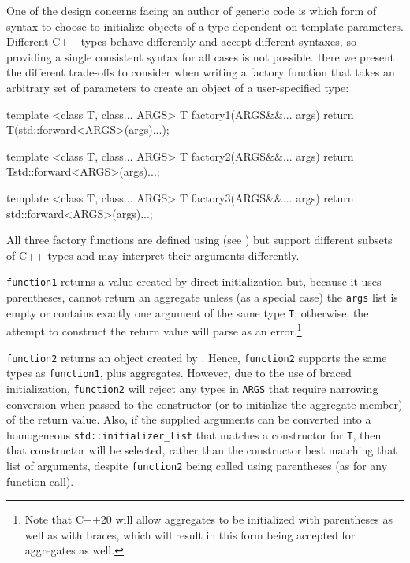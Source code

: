 One of the design concerns facing an author of generic code is which
form of syntax to choose to initialize objects of a type dependent on
template parameters. Different C++ types behave differently and accept
different syntaxes, so providing a single consistent syntax for all
cases is not possible. Here we present the different trade-offs to
consider when writing a factory function that takes an arbitrary set of
parameters to create an object of a user-specified type:

\begin{emcppslisting}
template <class T, class... ARGS>
T factory1(ARGS&&... args)
{
    return T(std::forward<ARGS>(args)...);
}

template <class T, class... ARGS>
T factory2(ARGS&&... args)
{
    return T{std::forward<ARGS>(args)...};
}

template <class T, class... ARGS>
T factory3(ARGS&&... args)
{
    return {std::forward<ARGS>(args)...};
}
\end{emcppslisting}


\noindent All three factory functions are defined using  (see ) but support
different subsets of C++ types and may interpret their arguments
differently.

\lstinline!function1! returns a value created by direct initialization but,
because it uses parentheses, cannot return an aggregate unless (as a
special case) the \lstinline!args! list is empty or contains exactly one
argument of the same type \lstinline!T!; otherwise, the attempt to
construct the return value will parse as an error.{\cprotect\footnote{Note
that C++20 will allow aggregates to be initialized with parentheses as
well as with braces, which will result in this form being accepted for
  aggregates as well.}}

\lstinline!function2! returns an object created by . Hence, \lstinline!function2! supports the same types as
\lstinline!function1!, plus aggregates. However, due to the use of braced
initialization, \lstinline!function2! will reject any types in
\lstinline!ARGS! that require narrowing conversion when passed to the
constructor (or to initialize the aggregate member) of the return value.
Also, if the supplied arguments can be converted into a homogeneous
\lstinline!std::initializer_list! that matches a constructor for
\lstinline!T!, then that constructor will be selected, rather than the
constructor best matching that list of arguments, despite
\lstinline!function2! being called using parentheses (as for any function
call).

